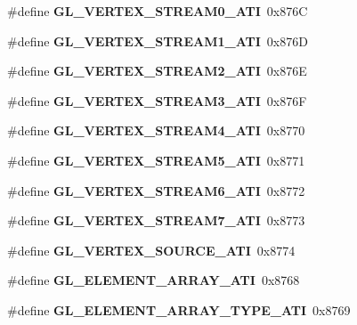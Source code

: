\begin{DoxyCompactItemize}
\item 
\#define {\bfseries G\+L\+\_\+\+V\+E\+R\+T\+E\+X\+\_\+\+S\+T\+R\+E\+A\+M0\+\_\+\+A\+T\+I}~0x876\+C\label{_s_d_l__opengl_8h_af77afccb3c1a29231f87c8296a22700d}

\item 
\#define {\bfseries G\+L\+\_\+\+V\+E\+R\+T\+E\+X\+\_\+\+S\+T\+R\+E\+A\+M1\+\_\+\+A\+T\+I}~0x876\+D\label{_s_d_l__opengl_8h_a27e51ceedbc3d9653ce9d325be157e47}

\item 
\#define {\bfseries G\+L\+\_\+\+V\+E\+R\+T\+E\+X\+\_\+\+S\+T\+R\+E\+A\+M2\+\_\+\+A\+T\+I}~0x876\+E\label{_s_d_l__opengl_8h_a11e7dab41fbe121699d05f6fc76e11dc}

\item 
\#define {\bfseries G\+L\+\_\+\+V\+E\+R\+T\+E\+X\+\_\+\+S\+T\+R\+E\+A\+M3\+\_\+\+A\+T\+I}~0x876\+F\label{_s_d_l__opengl_8h_a1aa1d137bbfc3b43fa9162662966e037}

\item 
\#define {\bfseries G\+L\+\_\+\+V\+E\+R\+T\+E\+X\+\_\+\+S\+T\+R\+E\+A\+M4\+\_\+\+A\+T\+I}~0x8770\label{_s_d_l__opengl_8h_ac3d92c3f367647e3b9ff44edb9ecaed3}

\item 
\#define {\bfseries G\+L\+\_\+\+V\+E\+R\+T\+E\+X\+\_\+\+S\+T\+R\+E\+A\+M5\+\_\+\+A\+T\+I}~0x8771\label{_s_d_l__opengl_8h_aa72b951b6903523d1f5eec3b3e7ff13b}

\item 
\#define {\bfseries G\+L\+\_\+\+V\+E\+R\+T\+E\+X\+\_\+\+S\+T\+R\+E\+A\+M6\+\_\+\+A\+T\+I}~0x8772\label{_s_d_l__opengl_8h_a694f243a7db59c6e071bcdc81c6b5c6a}

\item 
\#define {\bfseries G\+L\+\_\+\+V\+E\+R\+T\+E\+X\+\_\+\+S\+T\+R\+E\+A\+M7\+\_\+\+A\+T\+I}~0x8773\label{_s_d_l__opengl_8h_ac33884bef584579e14e9f7ce96ecf8b0}

\item 
\#define {\bfseries G\+L\+\_\+\+V\+E\+R\+T\+E\+X\+\_\+\+S\+O\+U\+R\+C\+E\+\_\+\+A\+T\+I}~0x8774\label{_s_d_l__opengl_8h_ab863e45e7c4cd0bdd24640a6a97ed024}

\item 
\#define {\bfseries G\+L\+\_\+\+E\+L\+E\+M\+E\+N\+T\+\_\+\+A\+R\+R\+A\+Y\+\_\+\+A\+T\+I}~0x8768\label{_s_d_l__opengl_8h_ac0d748284df954ba94d03ebf1a13252b}

\item 
\#define {\bfseries G\+L\+\_\+\+E\+L\+E\+M\+E\+N\+T\+\_\+\+A\+R\+R\+A\+Y\+\_\+\+T\+Y\+P\+E\+\_\+\+A\+T\+I}~0x8769\label{_s_d_l__opengl_8h_a9fd31f453c418ff8270fff081271a2b5}


\end{DoxyCompactItemize}
